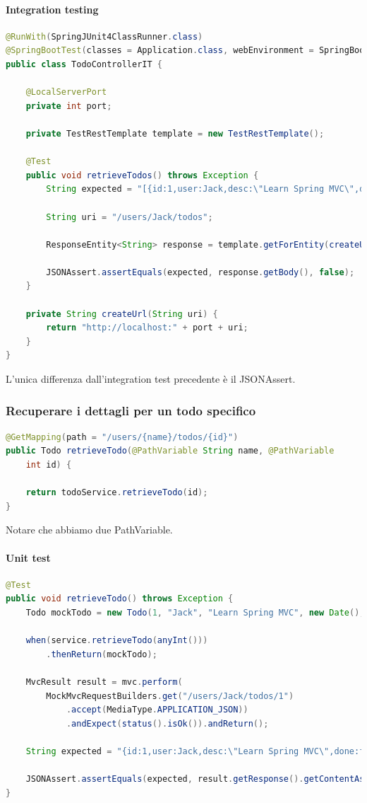 \documentclass[11pt,a4paper]{book}
\begin{document}
\paragraph{Integration testing}
\begin{lstlisting}[language = Java]
@RunWith(SpringJUnit4ClassRunner.class)
@SpringBootTest(classes = Application.class, webEnvironment = SpringBootTest.WebEnvironment.RANDOM_PORT)
public class TodoControllerIT {
	
	@LocalServerPort
	private int port;

	private TestRestTemplate template = new TestRestTemplate();

	@Test
	public void retrieveTodos() throws Exception {
		String expected = "[{id:1,user:Jack,desc:\"Learn Spring MVC\",done:false}, {id:2,user:Jack,desc:\"Learn Struts\",done:false}" + "]";
	
		String uri = "/users/Jack/todos";

		ResponseEntity<String> response = template.getForEntity(createUrl(uri), String.class);

		JSONAssert.assertEquals(expected, response.getBody(), false);
	}
	
	private String createUrl(String uri) {
		return "http://localhost:" + port + uri;
	}
}
\end{lstlisting}

L'unica differenza dall'integration test precedente è il JSONAssert.

\subsubsection{Recuperare i dettagli per un todo specifico}
\begin{lstlisting}[language = Java]
@GetMapping(path = "/users/{name}/todos/{id}")
public Todo retrieveTodo(@PathVariable String name, @PathVariable
	int id) {
	
	return todoService.retrieveTodo(id);
}
\end{lstlisting}

Notare che abbiamo due PathVariable.

\paragraph{Unit test}
\begin{lstlisting}[language = Java]
@Test
public void retrieveTodo() throws Exception {
	Todo mockTodo = new Todo(1, "Jack", "Learn Spring MVC", new Date(), false);
	
	when(service.retrieveTodo(anyInt()))
		.thenReturn(mockTodo);
	
	MvcResult result = mvc.perform(
		MockMvcRequestBuilders.get("/users/Jack/todos/1")
			.accept(MediaType.APPLICATION_JSON))
			.andExpect(status().isOk()).andReturn();
	
	String expected = "{id:1,user:Jack,desc:\"Learn Spring MVC\",done:false}";

	JSONAssert.assertEquals(expected, result.getResponse().getContentAsString() false);
}
\end{lstlisting}
\end{document}
